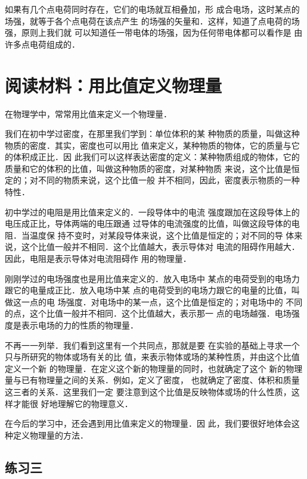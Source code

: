 如果有几个点电荷同时存在，它们的电场就互相叠加，形
成合电场，这时某点的场强，就等于各个点电荷在该点产生
的场强的矢量和．这样，知道了点电荷的场强，原则上我们就
可以知道任一带电体的场强，因为任何带电体都可以看作是
由许多点电荷组成的．

\section*{阅读材料：用比值定义物理量}
在物理学中，常常用比值来定义一个物理量．

我们在初中学过密度，在那里我们学到：单位体积的某
种物质的质量，叫做这种物质的密度．其实，密度也可以用比
值来定义，某种物质的物体，它的质量与它的体积成正比．因
此我们可以这样表达密度的定义：某种物质组成的物体，它的
质量和它的体积的比值，叫做这种物质的密度，对某种物质
来说，这个比值是恒定的；对不同的物质来说，这个比值一般
并不相同，因此，密度表示物质的一种特性．

初中学过的电阻是用比值来定义的．一段导体中的电流
强度跟加在这段导体上的电压成正比，导体两端的电压跟通
过导体的电流强度的比值，叫做这段导体的电阻．当温度保
持不变时，对某段导体来说，这个比值是恒定的；对不同的导
体来说，这个比值一般并不相同．这个比值越大，表示导体对
电流的阻碍作用越大．因此，电阻是表示导体对电流阻碍作
用的物理量．

刚刚学过的电场强度也是用比值来定义的．放入电场中
某点的电荷受到的电场力跟它的电量成正比．放入电场中某
点的电荷受到的电场力跟它的电量的比值，叫做这一点的电
场强度．对电场中的某一点，这个比值是恒定的；对电场中的
不同的点，这个比值一般并不相同．这个比值越大，表示那一
点的电场越强．电场强度是表示电场的力的性质的物理量．

不再一一列举．我们看到这里有一个共同点，那就是要
在实验的基础上寻求一个只与所研究的物体或场有关的比
值，来表示物体或场的某种性质，并由这个比值定义一个新
的物理量．在定义这个新的物理量的同时，也就确定了这个
新的物理量与已有物理量之间的关系．例如，定义了密度，
也就确定了密度、体积和质量这三者的关系．这里我们一定
要注意到这个比值是反映物体或场的什么性质，这样才能很
好地理解它的物理意义．

在今后的学习中，还会遇到用比值来定义的物理量．因
此，我们要很好地体会这种定义物理量的方法．

\subsection*{练习三}


